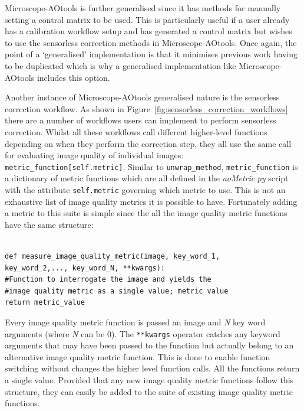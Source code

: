 Microscope-AOtools is further generalised since it has methods for manually setting a control matrix to be used. This is particularly useful if a user already has a calibration workflow setup and has generated a control matrix but wishes to use the sensorless correction methods in Microscope-AOtools. Once again, the point of a `generalised' implementation is that it minimises previous work having to be duplicated which is why a generalised implementation like Microscope-AOtools includes this option.

Another instance of Microscope-AOtools generalised nature is the sensorless correction workflow. As shown in Figure~\ref{fig:sensorless_correction_workflows} there are a number of workflows users can implement to perform sensorless correction. Whilst all these workflows call different higher-level functions depending on when they perform the correction step, they all use the same call for evaluating image quality of individual images: \lstinline|metric_function[self.metric]|. Similar to \lstinline|unwrap_method|, \lstinline|metric_function| is a dictionary of metric functions which are all defined in the \textit{aoMetric.py} script with the attribute \lstinline|self.metric| governing which metric to use. This is not an exhaustive list of image quality metrics it is possible to have. Fortunately adding a metric to this suite is simple since the all the image quality metric functions have the same structure:

\lstset{language=Python}
\begin{lstlisting}[firstline=1,lastline=5, frame=single]  % Start your code-block

def measure_image_quality_metric(image, key_word_1,
key_word_2,..., key_word_N, **kwargs):
#Function to interrogate the image and yields the 
#image quality metric as a single value; metric_value
return metric_value
\end{lstlisting}

Every image quality metric function is passed an image and \textit{N} key word arguments (where \textit{N} can be 0). The \lstinline|**kwargs| operator catches any keyword arguments that may have been passed to the function but actually belong to an alternative image quality metric function. This is done to enable function switching without changes the higher level function calls. All the functions return a single value. Provided that any new image quality metric functions follow this structure, they can easily be added to the suite of existing image quality metric functions. 

